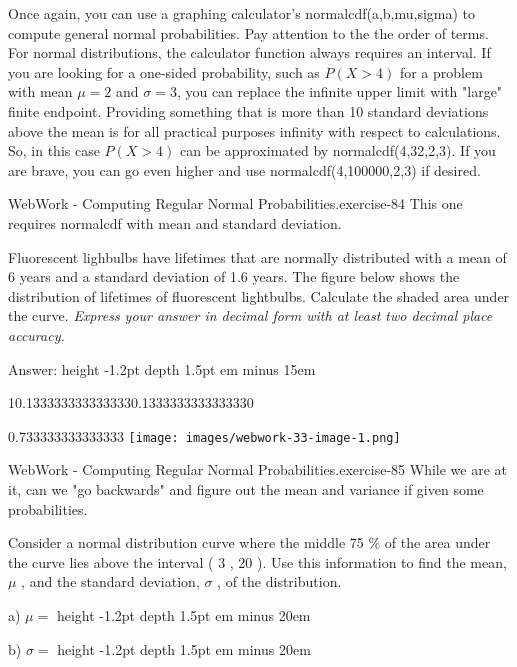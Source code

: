 \documentclass[10pt,]{book}
\newcommand{\fillin}[1]{\leavevmode\leaders\vrule height -1.2pt depth 1.5pt \hskip #1em minus #1em \null}
\numberwithin{equation}{section}
\newcommand{\gt}{>}
\begin{document}
%
\par
\hypertarget{p-1220}{}%
Once again, you can use a graphing calculator's normalcdf(a,b,mu,sigma) to compute general normal probabilities.  Pay attention to the the order of terms. For normal distributions, the calculator function always requires an interval. If you are looking for a one-sided probability, such as \(P(X \gt 4)\) for a problem with mean \(\mu = 2\) and \(\sigma = 3\), you can replace the infinite upper limit with "large" finite endpoint. Providing something that is more than 10 standard deviations above the mean is for all practical purposes infinity with respect to calculations. So, in this case \(P(X \gt 4)\) can be approximated by normalcdf(4,32,2,3).  If you are brave, you can go even higher and use normalcdf(4,100000,2,3) if desired.%
\par
\hypertarget{p-1221}{}%
\begin{inlineexercise}{WebWork - Computing Regular Normal Probabilities.}{exercise-84}%
\hypertarget{p-1222}{}%
This one requires normalcdf with mean and standard deviation.%
\par\medskip
\hypertarget{p-1223}{}%
Fluorescent lighbulbs have lifetimes that  are normally distributed with a mean of 6 years and a standard deviation of 1.6 years. The figure below shows the distribution of lifetimes of fluorescent lightbulbs. Calculate the shaded area under the curve.   \emph{Express your answer in decimal form with at least two decimal place accuracy.}%
\par
\hypertarget{p-1224}{}%
Answer:  \fillin{15}%
\begin{sidebyside}{1}{0.133333333333333}{0.133333333333333}{0}%
\begin{sbspanel}{0.733333333333333}%
\texttt{[image: images/webwork-33-image-1.png]}
\end{sbspanel}%
\end{sidebyside}%
\end{inlineexercise}
%
\par
\hypertarget{p-1225}{}%
\begin{inlineexercise}{WebWork - Computing Regular Normal Probabilities.}{exercise-85}%
\hypertarget{p-1226}{}%
While we are at it, can we "go backwards" and figure out the mean and variance if given some probabilities.%
\par\medskip
\hypertarget{p-1227}{}%
Consider a normal distribution curve where the middle 75 \% of the area under the curve lies above the interval ( 3 , 20 ). Use this information to find the mean,  \(\mu\) , and the standard deviation, \(\sigma\) , of the distribution.%
\par
\hypertarget{p-1228}{}%
a)  \(\mu =\)  \fillin{20}%
\par
\hypertarget{p-1229}{}%
b)  \(\sigma =\)  \fillin{20}%
\end{inlineexercise}
\end{document}
